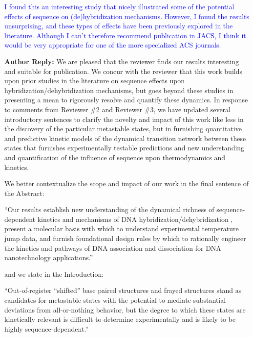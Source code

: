 \documentclass[11pt,a4paper]{letter} %
\newcommand*{\rood}[1]{{\color{red}{#1}}}
\begin{document}
\textcolor{blue}{I found this an interesting study that nicely illustrated some of the potential effects of sequence on (de)hybridization mechanisms. However, I found the results unsurprising, and these types of effects have been previously explored in the literature. Although I can't therefore recommend publication in JACS, I think it would be very appropriate for one of the more specialized ACS journals.}

\textbf{Author Reply:}  We are pleased that the reviewer finds our results interesting and suitable for publication. We concur with the reviewer that this work builds upon prior studies in the literature on sequence effects upon hybridization/dehybridization mechanisms, but goes beyond these studies in presenting a mean to rigorously resolve and quantify these dynamics. In response to comments from Reviewer \#2 and Reviewer \#3, we have updated several introductory sentences to clarify the novelty and impact of this work like less in the discovery of the particular metastable states, but in furnishing quantitative and predictive kinetic models of the dynamical transition network between these states that furnishes experimentally testable predictions and new understanding and quantification of the influence of sequence upon thermodynamics and kinetics.

We better contextualize the scope and impact of our work in the final sentence of the Abstract:

``Our results establish new understanding of the dynamical richness of sequence-dependent kinetics and mechanisms of DNA hybridization/dehybridization \rood{by furnishing quantitative and predictive kinetic models of the dynamical transition network between metastable states}, present a molecular basis with which to understand experimental temperature jump data, and furnish foundational design rules by which to rationally engineer the kinetics and pathways of DNA association and dissociation for DNA nanotechnology applications.''

and we state in the Introduction:

``Out-of-register ``shifted'' base paired structures \citep{Flamm2000RNAResolution, Romano2013DNADependence, Hinckley2014Coarse-grainedEffects, Maciejczyk2014DNAModel, Araque2016LatticeCooperativity, Xiao2019} and frayed structures \citep{Zgarbova2014BaseRNA, Nonin1995TerminalFraying, Nikolova2012ProbingSimulations, Andreatta2006UltrafastHelix} stand as candidates for metastable states with the potential to mediate substantial deviations from all-or-nothing behavior, but the degree to which these states are kinetically relevant is difficult to determine experimentally and is likely to be highly sequence-dependent.''
\end{document}
